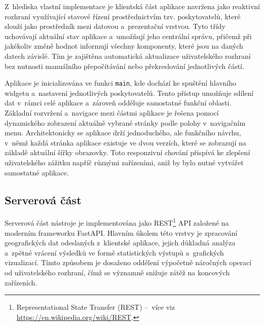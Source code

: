 
Z~hlediska vlastní implementace je klientská část aplikace navržena jako reaktivní rozhraní využívající stavové řízení prostřednictvím tzv. poskytovatelů, které slouží jako prostředník mezi datovou a~prezentační vrstvou.
Tyto třídy uchovávají aktuální stav aplikace a~umožňují jeho centrální správu, přičemž při jakékoliv změně hodnot informují všechny komponenty, které jsou na daných datech závislé.
Tím je zajištěna automatická aktualizace uživatelského rozhraní bez nutnosti manuálního přepočítávání nebo překreslování jednotlivých částí.

Aplikace je inicializována ve funkci \texttt{main}, kde dochází ke spuštění hlavního widgetu a~nastavení jednotlivých poskytovatelů.
Tento přístup umožňuje sdílení dat v~rámci celé aplikace a~zároveň odděluje samostatné funkční oblasti.
Základní rozvržení a~navigace mezi částmi aplikace je řešena pomocí dynamického zobrazení aktuálně vybrané stránky podle polohy v~navigačním menu.
Architektonicky se aplikace drží jednoduchého, ale funkčního návrhu, v~němž každá stránka aplikace existuje ve dvou verzích, které se zobrazují na základě aktuální šířky obrazovky.
Toto responzivní chování přispívá ke zlepšení uživatelského zážitku napříč různými zařízeními, aniž by bylo nutné vytvářet samostatné aplikace.

\subsection{Serverová část}
\label{server-section}

Serverová část nástroje je implementována jako REST\footnote{Representational State Transfer (REST) --~více viz \url{https://en.wikipedia.org/wiki/REST}.} API založené na moderním frameworku FastAPI.
Hlavním úkolem této vrstvy je zpracování geografických dat odeslaných z~klientské aplikace, jejich důkladná analýza a~zpětné vrácení výsledků ve formě statistických výstupů a~grafických vizualizací.
Tímto způsobem je dosaženo oddělení výpočetně náročných operací od uživatelského rozhraní, čímž se významně snižuje zátěž na koncových zařízeních.

